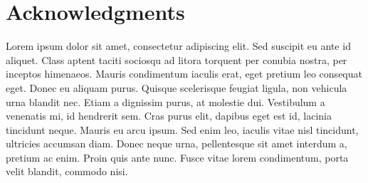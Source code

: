 \section{Acknowledgments}

Lorem ipsum dolor sit amet, consectetur adipiscing elit. Sed suscipit eu ante id aliquet. Class aptent taciti sociosqu ad litora torquent per conubia nostra, per inceptos himenaeos. Mauris condimentum iaculis erat, eget pretium leo consequat eget. Donec eu aliquam purus. Quisque scelerisque feugiat ligula, non vehicula urna blandit nec. Etiam a dignissim purus, at molestie dui. Vestibulum a venenatis mi, id hendrerit sem. Cras purus elit, dapibus eget est id, lacinia tincidunt neque. Mauris eu arcu ipsum. Sed enim leo, iaculis vitae nisl tincidunt, ultricies accumsan diam. Donec neque urna, pellentesque sit amet interdum a, pretium ac enim. Proin quis ante nunc. Fusce vitae lorem condimentum, porta velit blandit, commodo nisi.
